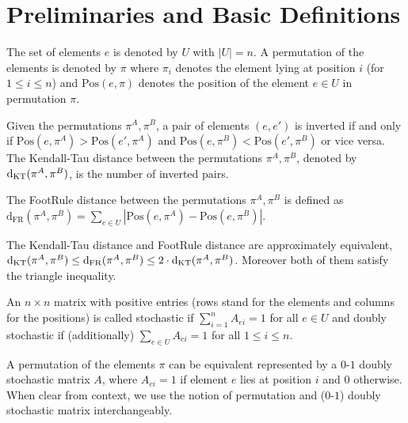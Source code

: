 \section{Preliminaries and Basic Definitions}
The set of elements $e$ is denoted by $U$ with $|U| = n$. A permutation of the elements is denoted by $\pi$ where $\pi_i$ denotes the element lying at position $i$ (for $1\leq i \leq n$) and $\mathrm{Pos}(e,\pi)$ denotes the position of the element $e \in U$ in permutation $\pi$.

\begin{definition}\label{d:KT}
Given the permutations $\pi^A,\pi^B$, a pair of elements $(e,e')$ is inverted if and only if $\mathrm{Pos}(e,\pi^A) > \mathrm{Pos}(e',\pi^A)$ and $\mathrm{Pos}(e,\pi^B) < \mathrm{Pos}(e',\pi^B)$ or vice versa. The Kendall-Tau distance between the permutations $\pi^A,\pi^B$, denoted by $\mathrm{d}_{\mathrm{KT}}(\pi^A,\pi^B)$, is the number of inverted pairs.
\end{definition}

\begin{definition}\label{d:FR}
The FootRule distance between the permutations $\pi^A,\pi^B$ is defined as $\mathrm{d}_{\mathrm{FR}}(\pi^A,\pi^B) = \sum_{e \in U}|\mathrm{Pos}(e,\pi^A) - \mathrm{Pos}(e,\pi^B)|$.
\end{definition}
\noindent The Kendall-Tau distance and FootRule distance are approximately equivalent, $\mathrm{d}_{\mathrm{KT}}(\pi^A,\pi^B) \leq \mathrm{d}_{\mathrm{FR}}(\pi^A,\pi^B) \leq 2 \cdot \mathrm{d}_{\mathrm{KT}}(\pi^A,\pi^B)$. Moreover both of them satisfy the triangle inequality.
\begin{definition} An $n \times n$ matrix with positive entries (rows stand for the elements and columns for the positions) is called stochastic if $\sum_{i = 1}^n A_{ei} = 1$ for all $e\in U$ and doubly stochastic if (additionally) $\sum_{e \in U} A_{ei}=1$ for all $1\leq i \leq n$.
\end{definition}
\noindent A permutation of the elements $\pi$ can be equivalent represented by a $0$-$1$ doubly stochastic matrix $A$, where $A_{ei}=1$ if element $e$ lies at position $i$ and $0$ otherwise. When clear from context, we use the notion of permutation and ($0$-$1$) doubly stochastic matrix interchangeably.

